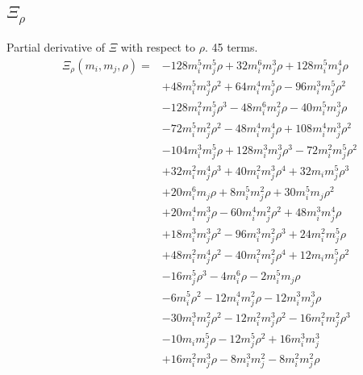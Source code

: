 \subsection*{$\Xi_{\rho}$}
Partial derivative of $\Xi$ with respect to $\rho$. 45 terms.
{\small
\begin{align*}
\Xi_{\rho}(m_i,m_j,\rho)={}&-128m_i^{5}m_j^{5}\rho+32m_i^{6}m_j^{3}\rho+128m_i^{5}m_j^{4}\rho\\
&+48m_i^{5}m_j^{3}\rho^{2}+64m_i^{4}m_j^{5}\rho-96m_i^{3}m_j^{5}\rho^{2}\\
&-128m_i^{2}m_j^{5}\rho^{3}-48m_i^{6}m_j^{2}\rho-40m_i^{5}m_j^{3}\rho\\
&-72m_i^{5}m_j^{2}\rho^{2}-48m_i^{4}m_j^{4}\rho+108m_i^{4}m_j^{3}\rho^{2}\\
&-104m_i^{3}m_j^{5}\rho+128m_i^{3}m_j^{3}\rho^{3}-72m_i^{2}m_j^{5}\rho^{2}\\
&+32m_i^{2}m_j^{4}\rho^{3}+40m_i^{2}m_j^{3}\rho^{4}+32m_im_j^{5}\rho^{3}\\
&+20m_i^{6}m_j\rho+8m_i^{5}m_j^{2}\rho+30m_i^{5}m_j\rho^{2}\\
&+20m_i^{4}m_j^{3}\rho-60m_i^{4}m_j^{2}\rho^{2}+48m_i^{3}m_j^{4}\rho\\
&+18m_i^{3}m_j^{3}\rho^{2}-96m_i^{3}m_j^{2}\rho^{3}+24m_i^{2}m_j^{5}\rho\\
&+48m_i^{2}m_j^{4}\rho^{2}-40m_i^{2}m_j^{2}\rho^{4}+12m_im_j^{5}\rho^{2}\\
&-16m_j^{5}\rho^{3}-4m_i^{6}\rho-2m_i^{5}m_j\rho\\
&-6m_i^{5}\rho^{2}-12m_i^{4}m_j^{2}\rho-12m_i^{3}m_j^{3}\rho\\
&-30m_i^{3}m_j^{2}\rho^{2}-12m_i^{2}m_j^{3}\rho^{2}-16m_i^{2}m_j^{2}\rho^{3}\\
&-10m_im_j^{5}\rho-12m_j^{5}\rho^{2}+16m_i^{3}m_j^{3}\\
&+16m_i^{2}m_j^{3}\rho-8m_i^{3}m_j^{2}-8m_i^{2}m_j^{2}\rho
\end{align*}
}

